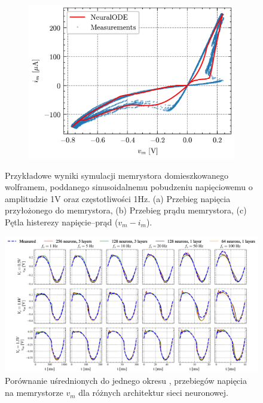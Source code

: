 \documentclass[11pt, oneside]{article}
\begin{document}
\begin{figure}[H]
\begin{subfigure}[b]{\subwidth}
        \includegraphics[width=\linewidth]{sample_results/hysteresis.png}
        \caption{}
    \end{subfigure}
    \caption{Przykładowe wyniki symulacji memrystora domieszkowanego wolframem, poddanego sinusoidalnemu pobudzeniu napięciowemu o amplitudzie 1V oraz częstotliwości 1Hz. (a) Przebieg napięcia przyłożonego do memrystora, (b) Przebieg prądu memrystora, (c) Pętla histerezy napięcie–prąd ($v_m - i_m$).}
    \label{fig:sample-results}
\end{figure}



\begin{figure}[htbp!]
    \centering
    \includegraphics[width=\linewidth]{sample_results/simulated_vms.pdf}
    \caption{Porównanie uśrednionych do jednego okresu , przebiegów napięcia na memrystorze $v_m$ dla różnych architektur sieci neuronowej.}
\end{figure}
\end{document}
